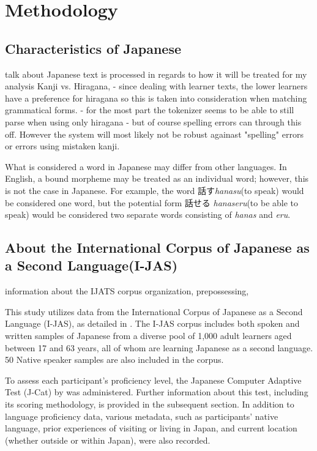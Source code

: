 \chapter{Methodology}

\section{Characteristics of Japanese}
talk about Japanese text is processed in regards to how it will be treated for my analysis
   Kanji vs. Hiragana, - since dealing with learner texts, the lower learners have a preference for hiragana so this
is taken into consideration when matching grammatical forms. - for the most part the tokenizer seems to be able to
still parse when using only hiragana - but of course spelling errors can through this off. However the system will
most likely not be robust againast "spelling" errors or errors using mistaken kanji.

What is considered a word in Japanese may differ from other languages. In English, a bound morpheme may be treated as an individual word; however, this is not the case in Japanese. For example, the word 話す\textit{hanasu}(to speak) would be considered one word, but the potential form 話せる \textit{hanaseru}(to be able to speak) would be considered two separate words consisting of \textit{hanas} and \textit{eru}.

\section{About the International Corpus of Japanese as a Second Language(I-JAS)}
information about the IJATS corpus organization, prepossessing,

This study utilizes data from the International Corpus of Japanese as a Second Language (I-JAS), as detailed in \citet{Sakoda2020}.  The I-JAS corpus includes both spoken and written samples of Japanese from a diverse pool of 1,000 adult learners aged between 17 and 63 years, all of whom are learning Japanese as a second language. 50 Native speaker samples are also included in the corpus.

To assess each participant's proficiency level, the Japanese Computer Adaptive Test (J-Cat) by \citet{Imai2009} was administered. Further information about this test, including its scoring methodology, is provided in the subsequent section. In addition to language proficiency data, various metadata, such as participants' native language, prior experiences of visiting or living in Japan, and current location (whether outside or within Japan), were also recorded.

